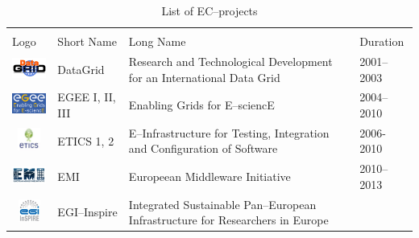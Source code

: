 \begin{table}[!h]
\renewcommand{\arraystretch}{1.3}
\caption{List of EC--projects}
\label{tab:eup}
\centering
\begin{tabular}{p{1.6cm}p{2cm}p{5cm}l}
\hline
\hline
\\
Logo & Short Name & Long Name & Duration\\
\hline
\hline
\begin{minipage}{.3\textwidth}
\includegraphics[width=15mm,height=7.5mm]{images/datagrid}
\end{minipage}
    & DataGrid &
Research and Technological Development for an International Data Grid & 2001--2003\\
\begin{minipage}{.3\textwidth}
\includegraphics[width=15mm,height=7.5mm]{images/egee}
\end{minipage}
     & EGEE I, II, III &
Enabling Grids for E--sciencE & 2004--2010\\
\begin{minipage}{.3\textwidth}
\includegraphics[width=15mm,height=7.5mm]{images/etics}
\end{minipage}
     & ETICS 1, 2 &
E--Infrastructure for Testing, Integration and Configuration of Software & 2006-2010\\
\begin{minipage}{.3\textwidth}
\includegraphics[width=15mm,height=7.5mm]{images/emi}
\end{minipage}
     & EMI &
Europeean Middleware Initiative & 2010--2013\\
\begin{minipage}{.3\textwidth}
\includegraphics[width=15mm,height=7.5mm]{images/egi-inspire}
\end{minipage}
     & EGI--Inspire &
Integrated Sustainable Pan--European Infrastructure for Researchers in Europe

\end{tabular}
\end{table}
